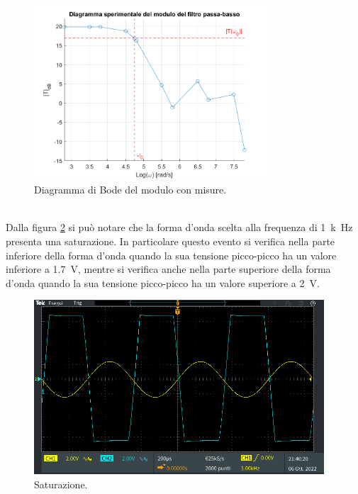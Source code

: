 \documentclass{report}
\begin{document}
\begin{figure}[h!]
	\centering
	\includegraphics[height=6.5cm]{immagini/modulo_sper}
	\caption{Diagramma di Bode del modulo con misure.}
	\label{figura:modulosperimentale}
\end{figure}
\\Dalla figura \ref{figura:satur} si può notare che la forma d'onda scelta alla frequenza di \SI{1}{k\hertz} presenta una saturazione. In particolare questo evento si verifica nella parte inferiore della forma d'onda quando la sua tensione picco-picco ha un valore inferiore a \SI{1.7}{\volt}, mentre si verifica anche nella parte superiore della forma d'onda quando la sua tensione picco-picco ha un valore superiore a \SI{2}{\volt}.
\begin{figure}[h!]
	\centering
	\includegraphics[height=6.5cm]{immagini/TEK00015}
	\caption{Saturazione.}
	\label{figura:satur}
\end{figure}



\end{document}
